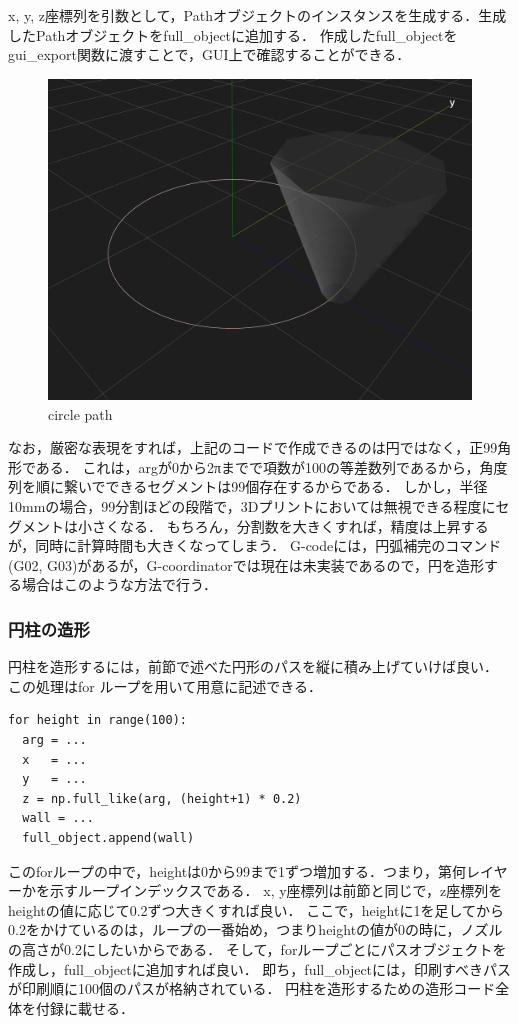 \documentclass{article}
\begin{document}
\begin{twocolumn}
x, y, z座標列を引数として，Pathオブジェクトのインスタンスを生成する．生成したPathオブジェクトをfull\_objectに追加する．
作成したfull\_objectをgui\_export関数に渡すことで，GUI上で確認することができる．
\begin{figure}[h]
  \centering
  \includegraphics[width=0.8\linewidth]{img/circle_path.png}
  \caption{circle path}
  \label{fig:circlepath}
\end{figure}
なお，厳密な表現をすれば，上記のコードで作成できるのは円ではなく，正99角形である．
これは，argが0から2πまでで項数が100の等差数列であるから，角度列を順に繋いでできるセグメントは99個存在するからである．
しかし，半径10mmの場合，99分割ほどの段階で，3Dプリントにおいては無視できる程度にセグメントは小さくなる．
もちろん，分割数を大きくすれば，精度は上昇するが，同時に計算時間も大きくなってしまう．
G-codeには，円弧補完のコマンド(G02, G03)があるが，G-coordinatorでは現在は未実装であるので，円を造形する場合はこのような方法で行う．

\subsubsection{円柱の造形}
円柱を造形するには，前節で述べた円形のパスを縦に積み上げていけば良い．
この処理はfor ループを用いて用意に記述できる．
\begin{lstlisting}[breaklines=false]
for height in range(100):
  arg = ...
  x   = ...
  y   = ...
  z = np.full_like(arg, (height+1) * 0.2)
  wall = ...
  full_object.append(wall)
\end{lstlisting}
このforループの中で，heightは0から99まで1ずつ増加する．つまり，第何レイヤーかを示すループインデックスである．
x, y座標列は前節と同じで，z座標列をheightの値に応じて0.2ずつ大きくすれば良い．
ここで，heightに1を足してから0.2をかけているのは，ループの一番始め，つまりheightの値が0の時に，ノズルの高さが0.2にしたいからである．
そして，forループごとにパスオブジェクトを作成し，full\_objectに追加すれば良い．
即ち，full\_objectには，印刷すべきパスが印刷順に100個のパスが格納されている．
円柱を造形するための造形コード全体を付録に載せる．


\end{twocolumn}
\end{document}
